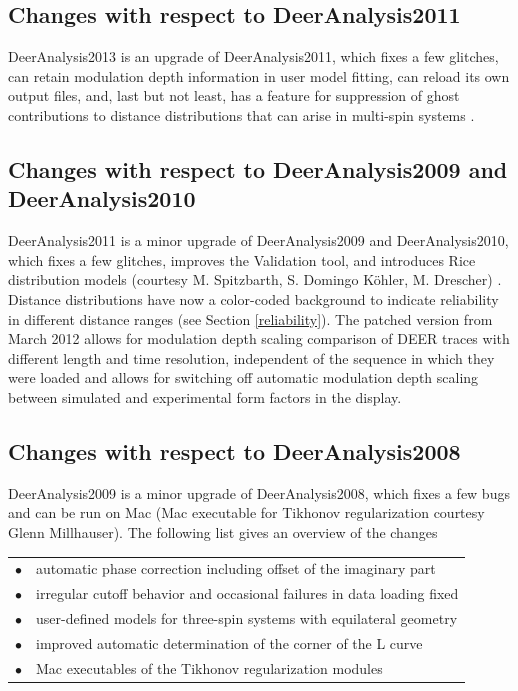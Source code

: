 \documentclass{article}
\begin{document}
\subsection{Changes with respect to DeerAnalysis2011}
\label{changes_2013}

DeerAnalysis2013 is an upgrade of DeerAnalysis2011, which fixes a few glitches, can retain modulation depth information in user model fitting, can reload its own output files, and, last but not least, has a feature for suppression of ghost contributions to distance distributions that can arise in multi-spin systems \cite{vonHagens2013}.    

\subsection{Changes with respect to DeerAnalysis2009 and DeerAnalysis2010}
\label{changes_2010_1}

DeerAnalysis2011 is a minor upgrade of DeerAnalysis2009 and DeerAnalysis2010, which fixes a few glitches, improves the {\ttfamily Validation} tool, and introduces Rice distribution models (courtesy M. Spitzbarth, S. Domingo K\"ohler, M. Drescher) \cite{koehler2011}. Distance distributions have now a color-coded background to indicate reliability in different distance ranges (see Section \ref{reliability}). The patched version from March 2012 allows for modulation depth scaling comparison of DEER traces with different length and time resolution, independent of the sequence in which they were loaded and allows for switching off automatic modulation depth scaling between simulated and experimental form factors in the display.    

\subsection{Changes with respect to DeerAnalysis2008}
\label{changes_2008_1}

DeerAnalysis2009 is a minor upgrade of DeerAnalysis2008, which fixes a few bugs and can be run on Mac (Mac executable for Tikhonov regularization courtesy Glenn Millhauser). The following list gives an overview of the changes    

\begin{tabular}{ll}
\noalign{\smallskip}
$\bullet$ & automatic phase correction including offset of the imaginary part\\
$\bullet$ & irregular cutoff behavior and occasional failures in data loading fixed\\
$\bullet$ & user-defined models for three-spin systems with equilateral geometry\\
$\bullet$ & improved automatic determination of the corner of the L curve\\
$\bullet$ & Mac executables of the Tikhonov regularization modules\\ 
\end{tabular}
\end{document}
